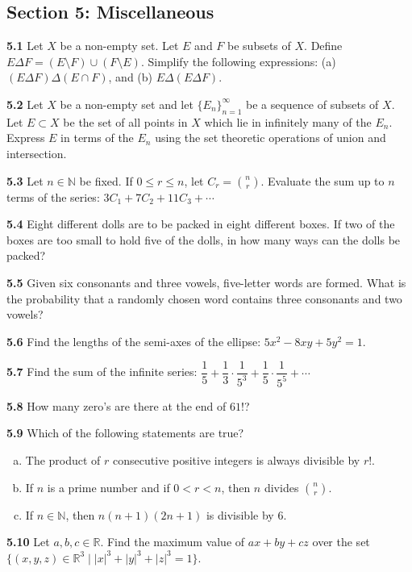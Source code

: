 \documentclass[11pt,a4paper]{article}
\newcommand{\N}{\mathbb{N}}
\newcommand{\R}{\mathbb{R}}
\newcommand{\examsec}[1]{%
  \subsection*{#1}
  \vspace{-2pt}
}
\newcommand{\qitem}[1]{\par\medskip\noindent\textbf{#1}\hspace{0.5em}}
\begin{document}
\examsec{Section 5: Miscellaneous}

\qitem{5.1} Let $X$ be a non-empty set. Let $E$ and $F$ be subsets of $X$. Define $E\Delta F = (E \setminus F) \cup (F \setminus E)$. Simplify the following expressions: (a) $(E\Delta F)\Delta(E \cap F)$, and (b) $E\Delta(E\Delta F)$.

\qitem{5.2} Let $X$ be a non-empty set and let $\{E_n\}_{n=1}^{\infty}$ be a sequence of subsets of $X$. Let $E \subset X$ be the set of all points in $X$ which lie in infinitely many of the $E_n$. Express $E$ in terms of the $E_n$ using the set theoretic operations of union and intersection.

\qitem{5.3} Let $n \in \N$ be fixed. If $0 \le r \le n$, let $C_r = \binom{n}{r}$. Evaluate the sum up to $n$ terms of the series: $3C_1 + 7C_2 + 11C_3 + \cdots$

\qitem{5.4} Eight different dolls are to be packed in eight different boxes. If two of the boxes are too small to hold five of the dolls, in how many ways can the dolls be packed?

\qitem{5.5} Given six consonants and three vowels, five-letter words are formed. What is the probability that a randomly chosen word contains three consonants and two vowels?

\qitem{5.6} Find the lengths of the semi-axes of the ellipse: $5x^2 - 8xy + 5y^2 = 1$.

\qitem{5.7} Find the sum of the infinite series: $\dfrac{1}{5} + \dfrac{1}{3}\cdot\dfrac{1}{5^3} + \dfrac{1}{5}\cdot\dfrac{1}{5^5} + \cdots$

\qitem{5.8} How many zero's are there at the end of $61!$?

\qitem{5.9} Which of the following statements are true?
\begin{enumerate}[a.]
  \item The product of $r$ consecutive positive integers is always divisible by $r!$.
  \item If $n$ is a prime number and if $0 < r < n$, then $n$ divides $\binom{n}{r}$.
  \item If $n \in \N$, then $n(n + 1)(2n + 1)$ is divisible by $6$.
\end{enumerate}

\qitem{5.10} Let $a, b, c \in \R$. Find the maximum value of $ax + by + cz$ over the set $\{(x, y, z) \in \R^3 \mid |x|^3 + |y|^3 + |z|^3 = 1\}$.
\end{document}
